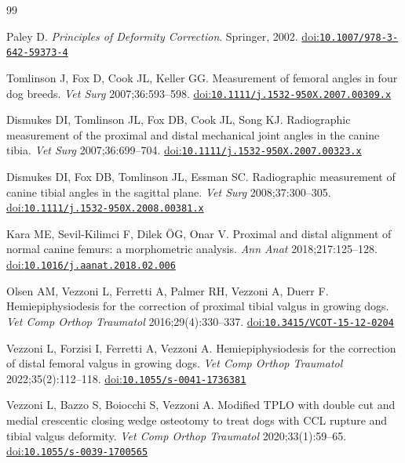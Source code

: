 \newcommand{\doi}[1]{\href{https://doi.org/#1}{doi:\nolinkurl{#1}}}
\cleardoublepage
{}
{}
\begin{thebibliography}{99}
\small\setlength{\parskip}{0.15em}\setlength{\itemsep}{0.2em}

 Paley D. \emph{Principles of Deformity Correction}. Springer, 2002. \doi{10.1007/978-3-642-59373-4}

 Tomlinson J, Fox D, Cook JL, Keller GG. Measurement of femoral angles in four dog breeds.
\emph{Vet Surg} 2007;36:593--598. \doi{10.1111/j.1532-950X.2007.00309.x}

 Dismukes DI, Tomlinson JL, Fox DB, Cook JL, Song KJ. Radiographic measurement of the proximal
and distal mechanical joint angles in the canine tibia. \emph{Vet Surg} 2007;36:699--704.
\doi{10.1111/j.1532-950X.2007.00323.x}

 Dismukes DI, Fox DB, Tomlinson JL, Essman SC. Radiographic measurement of canine tibial
angles in the sagittal plane. \emph{Vet Surg} 2008;37:300--305. \doi{10.1111/j.1532-950X.2008.00381.x}

 Kara ME, Sevil-Kilimci F, Dilek ÖG, Onar V. Proximal and distal alignment of normal canine femurs:
a morphometric analysis. \emph{Ann Anat} 2018;217:125--128. \doi{10.1016/j.aanat.2018.02.006}

 Olsen AM, Vezzoni L, Ferretti A, Palmer RH, Vezzoni A, Duerr F. Hemiepiphysiodesis for the
correction of proximal tibial valgus in growing dogs. \emph{Vet Comp Orthop Traumatol} 2016;29(4):330--337.
\doi{10.3415/VCOT-15-12-0204}

 Vezzoni L, Forzisi I, Ferretti A, Vezzoni A. Hemiepiphysiodesis for the correction of distal
femoral valgus in growing dogs. \emph{Vet Comp Orthop Traumatol} 2022;35(2):112--118. \doi{10.1055/s-0041-1736381}

 Vezzoni L, Bazzo S, Boiocchi S, Vezzoni A. Modified TPLO with double cut and medial crescentic
closing wedge osteotomy to treat dogs with CCL rupture and tibial valgus deformity. \emph{Vet Comp Orthop Traumatol}
2020;33(1):59--65. \doi{10.1055/s-0039-1700565}


\end{thebibliography}
